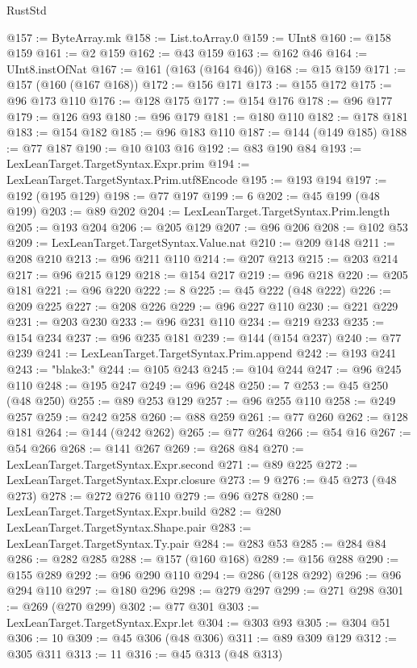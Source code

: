 \begin{lexlean}{RustStd}
\begin{coremodule}
@157 := ByteArray.mk
@158 := List.toArray.{0}
@159 := UInt8
@160 := @158 @159
@161 := @2 @159
@162 := @43 @159
@163 := @162 @46
@164 := UInt8.instOfNat
@167 := @161 (@163 (@164 @46))
@168 := @15 @159
@171 := @157 (@160 (@167 @168))
@172 := @156 @171
@173 := @155 @172
@175 := @96 @173 @110
@176 := @128 @175
@177 := @154 @176
@178 := @96 @177
@179 := @126 @93
@180 := @96 @179
@181 := @180 @110
@182 := @178 @181
@183 := @154 @182
@185 := @96 @183 @110
@187 := @144 (@149 @185)
@188 := @77 @187
@190 := @10 @103 @16
@192 := @83 @190 @84
@193 := LexLeanTarget.TargetSyntax.Expr.prim
@194 := LexLeanTarget.TargetSyntax.Prim.utf8Encode
@195 := @193 @194
@197 := @192 (@195 @129)
@198 := @77 @197
@199 := 6
@202 := @45 @199 (@48 @199)
@203 := @89 @202
@204 := LexLeanTarget.TargetSyntax.Prim.length
@205 := @193 @204
@206 := @205 @129
@207 := @96 @206
@208 := @102 @53
@209 := LexLeanTarget.TargetSyntax.Value.nat
@210 := @209 @148
@211 := @208 @210
@213 := @96 @211 @110
@214 := @207 @213
@215 := @203 @214
@217 := @96 @215 @129
@218 := @154 @217
@219 := @96 @218
@220 := @205 @181
@221 := @96 @220
@222 := 8
@225 := @45 @222 (@48 @222)
@226 := @209 @225
@227 := @208 @226
@229 := @96 @227 @110
@230 := @221 @229
@231 := @203 @230
@233 := @96 @231 @110
@234 := @219 @233
@235 := @154 @234
@237 := @96 @235 @181
@239 := @144 (@154 @237)
@240 := @77 @239
@241 := LexLeanTarget.TargetSyntax.Prim.append
@242 := @193 @241
@243 := "blake3:"
@244 := @105 @243
@245 := @104 @244
@247 := @96 @245 @110
@248 := @195 @247
@249 := @96 @248
@250 := 7
@253 := @45 @250 (@48 @250)
@255 := @89 @253 @129
@257 := @96 @255 @110
@258 := @249 @257
@259 := @242 @258
@260 := @88 @259
@261 := @77 @260
@262 := @128 @181
@264 := @144 (@242 @262)
@265 := @77 @264
@266 := @54 @16
@267 := @54 @266
@268 := @141 @267
@269 := @268 @84
@270 := LexLeanTarget.TargetSyntax.Expr.second
@271 := @89 @225
@272 := LexLeanTarget.TargetSyntax.Expr.closure
@273 := 9
@276 := @45 @273 (@48 @273)
@278 := @272 @276 @110
@279 := @96 @278
@280 := LexLeanTarget.TargetSyntax.Expr.build
@282 := @280 LexLeanTarget.TargetSyntax.Shape.pair
@283 := LexLeanTarget.TargetSyntax.Ty.pair
@284 := @283 @53
@285 := @284 @84
@286 := @282 @285
@288 := @157 (@160 @168)
@289 := @156 @288
@290 := @155 @289
@292 := @96 @290 @110
@294 := @286 (@128 @292)
@296 := @96 @294 @110
@297 := @180 @296
@298 := @279 @297
@299 := @271 @298
@301 := @269 (@270 @299)
@302 := @77 @301
@303 := LexLeanTarget.TargetSyntax.Expr.let
@304 := @303 @93
@305 := @304 @51
@306 := 10
@309 := @45 @306 (@48 @306)
@311 := @89 @309 @129
@312 := @305 @311
@313 := 11
@316 := @45 @313 (@48 @313)

\end{coremodule}
\end{lexlean}
